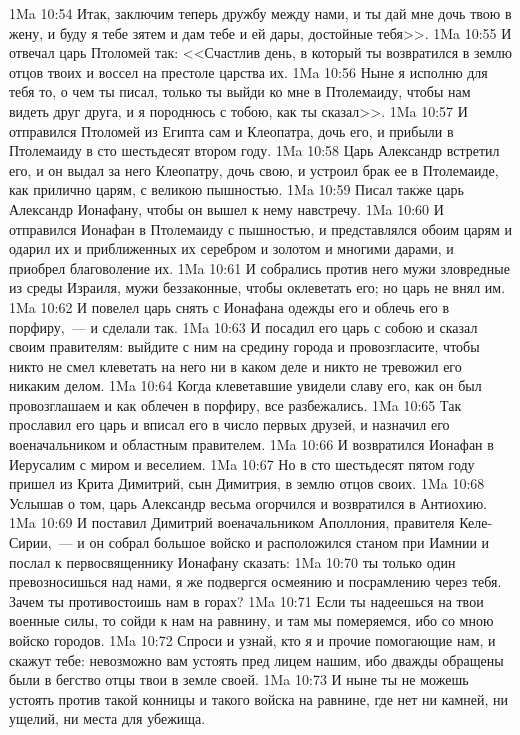 \vs 1Ma 10:54 Итак, заключим теперь дружбу между нами, и ты дай мне дочь твою в жену, и буду я тебе зятем и дам тебе и ей дары, достойные тебя>>.
\vs 1Ma 10:55 И отвечал царь Птоломей так: <<Счастлив день, в который ты возвратился в землю отцов твоих и воссел на престоле царства их.
\vs 1Ma 10:56 Ныне я исполню для тебя то, о чем ты писал, только ты выйди ко мне в Птолемаиду, чтобы нам видеть друг друга, и я породнюсь с тобою, как ты сказал>>.
\vs 1Ma 10:57 И отправился Птоломей из Египта сам и Клеопатра, дочь его, и прибыли в Птолемаиду в сто шестьдесят втором году.
\vs 1Ma 10:58 Царь Александр встретил его, и он выдал за него Клеопатру, дочь свою, и устроил брак ее в Птолемаиде, как прилично царям, с великою пышностью.
\vs 1Ma 10:59 Писал также царь Александр Ионафану, чтобы он вышел к нему навстречу.
\vs 1Ma 10:60 И отправился Ионафан в Птолемаиду с пышностью, и представлялся обоим царям и одарил их и приближенных их серебром и золотом и многими дарами, и приобрел благоволение их.
\vs 1Ma 10:61 И собрались против него мужи зловредные из среды Израиля, мужи беззаконные, чтобы оклеветать его; но царь не внял им.
\vs 1Ma 10:62 И повелел царь снять с Ионафана одежды его и облечь его в порфиру,~--- и сделали так.
\vs 1Ma 10:63 И посадил его царь с собою и сказал своим правителям: выйдите с ним на средину города и провозгласите, чтобы никто не смел клеветать на него ни в каком деле и никто не тревожил его никаким делом.
\vs 1Ma 10:64 Когда клеветавшие увидели славу его, как он был провозглашаем и как облечен в порфиру, все разбежались.
\vs 1Ma 10:65 Так прославил его царь и вписал его в число первых друзей, и назначил его военачальником и областным правителем.
\vs 1Ma 10:66 И возвратился Ионафан в Иерусалим с миром и веселием.
\rsbpar\vs 1Ma 10:67 Но в сто шестьдесят пятом году пришел из Крита Димитрий, сын Димитрия, в землю отцов своих.
\vs 1Ma 10:68 Услышав о том, царь Александр весьма огорчился и возвратился в Антиохию.
\vs 1Ma 10:69 И поставил Димитрий военачальником Аполлония, правителя Келе-Сирии,~--- и он собрал большое войско и расположился станом при Иамнии и послал к первосвященнику Ионафану сказать:
\vs 1Ma 10:70 ты только один превозносишься над нами, я же подвергся осмеянию и посрамлению через тебя. Зачем ты противостоишь нам в горах?
\vs 1Ma 10:71 Если ты надеешься на твои военные силы, то сойди к нам на равнину, и там мы померяемся, ибо со мною войско городов.
\vs 1Ma 10:72 Спроси и узнай, кто я и прочие помогающие нам, и скажут тебе: невозможно вам устоять пред лицем нашим, ибо дважды обращены были в бегство отцы твои в земле своей.
\vs 1Ma 10:73 И ныне ты не можешь устоять против такой конницы и такого войска на равнине, где нет ни камней, ни ущелий, ни места для убежища.
